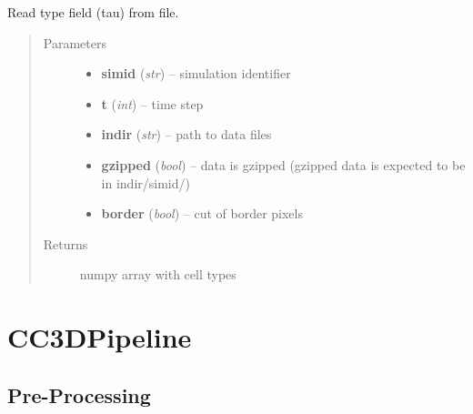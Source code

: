 \documentclass[letterpaper,10pt,english]{sphinxmanual}
\begin{document}

\begin{fulllineitems}
\label{Readers:Readers.readTau}
Read type field (tau) from file.
\begin{quote}\begin{description}
\item[{Parameters}] \leavevmode\begin{itemize}
\item {} 
\textbf{simid} (\emph{str}) -- simulation identifier

\item {} 
\textbf{t} (\emph{int}) -- time step

\item {} 
\textbf{indir} (\emph{str}) -- path to data files

\item {} 
\textbf{gzipped} (\emph{bool}) -- data is gzipped (gzipped data is expected to be in indir/simid/)

\item {} 
\textbf{border} (\emph{bool}) -- cut of border pixels

\end{itemize}

\item[{Returns}] \leavevmode
numpy array with cell types

\end{description}\end{quote}

\end{fulllineitems}



\chapter{CC3DPipeline}
\label{CC3DPipeline:cc3dpipeline}\label{CC3DPipeline::doc}

\section{Pre-Processing}
\label{CC3DPipeline:pre-processing}
\end{document}
